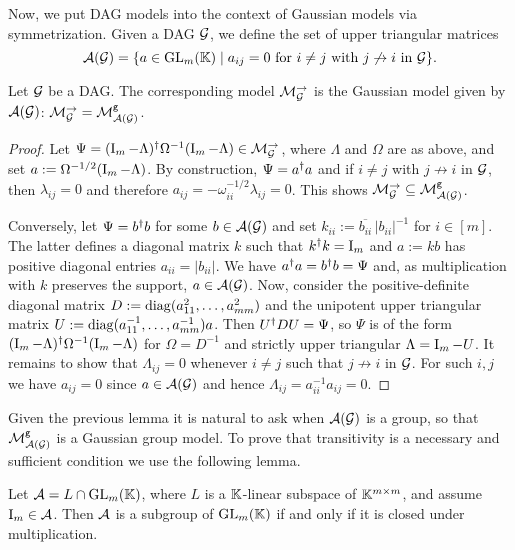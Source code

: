 Now, we put DAG models into the context of Gaussian models via symmetrization. Given a DAG $\mathcal{G}$, we define the set of upper triangular matrices
\begin{equation}
	\label{eq:defnAG} %
	\AG = \{ a \in \GL_m(\KK) \mid a_{ij}=0 \text{ for } i \neq j \text{ with } j \not \to i \text{ in }  \Gcal \} .
\end{equation}


\begin{lemma}
	\label{lem:DAGmodelEqualsMgAG}
	Let $\mathcal{G}$ be a DAG. The corresponding model $\mathcal{M}_{\mathcal{G}}^{\to}$ is the Gaussian model given by $\mathcal{A}(\mathcal{G})$: $\mathcal{M}_{\mathcal{G}}^{\to} = \mathcal{M}^{\mathtt{g}}_{\mathcal{A}(\mathcal{G})}$.
\end{lemma}

\begin{proof}
	Let $\Psi = (\operatorname{I}_m - \Lambda)^{\dagger} \Omega^{-1} (\operatorname{I}_m - \Lambda) \in \mathcal{M}_{\mathcal{G}}^{\to}$, where $\Lambda$ and $\Omega$ are as above, and set
	$a := \Omega^{-1/2} (\operatorname{I}_m - \Lambda)$. By construction, $\Psi = a^{\dagger} a$ and if $i \neq j$ with $j \not \to i$ in $\mathcal{G}$, then $\lambda_{ij} = 0$ and therefore $a_{ij} = -\omega_{ii}^{-1/2} \lambda_{ij} = 0$. This shows  $\mathcal{M}_{\mathcal{G}}^{\to} \subseteq \mathcal{M}^{\mathtt{g}}_{\mathcal{A}(\mathcal{G})}$.
	
	Conversely, let $\Psi = b^{\dagger} b$ for some $b \in \mathcal{A}(\mathcal{G})$ and set $k_{ii} := \overline{b_{ii}} \, |b_{ii}|^{-1}$ for $i \in [m]$. The latter defines a diagonal matrix $k$ such that $k^{\dagger} k = \operatorname{I}_m$ and $a := kb$ has positive diagonal entries $a_{ii} = |b_{ii}|$. We have $a^{\dagger} a = b^{\dagger} b = \Psi$ and, as multiplication with $k$ preserves the support, $a \in \mathcal{A}(\mathcal{G})$. 
	Now, consider the positive-definite diagonal matrix $D := \operatorname{diag}( a_{11}^2, \ldots, a_{mm}^2 )$ and the unipotent upper triangular matrix $U := \operatorname{diag}( a_{11}^{-1}, \ldots, a_{mm}^{-1} ) a$. Then $U^{\dagger} D U = \Psi$, so $\Psi$ is of the form $(\operatorname{I}_m - \Lambda)^{\dagger} \Omega^{-1} (\operatorname{I}_m - \Lambda)$ for $\Omega = D^{-1}$ and strictly upper triangular $\Lambda = \operatorname{I}_m - U$. It remains to show that $\Lambda_{ij} = 0$ whenever $i \neq j$ such that $j \not \to i$ in $\mathcal{G}$. For such $i,j$ we have $a_{ij} = 0$ since $a \in \mathcal{A}(\mathcal{G})$ and hence $\Lambda_{ij} = a_{ii}^{-1} a_{ij} = 0$. 
\end{proof}

Given the previous lemma it is natural to ask when $\mathcal{A}(\mathcal{G})$ is a group, so that $\mathcal{M}^{\mathtt{g}}_{\mathcal{A}(\mathcal{G})}$ is a Gaussian group model.
To prove that transitivity is a necessary and sufficient condition we use the following lemma.

\begin{lemma}\label{lem:GroupOnlyMultiplication}
	Let $\mathcal{A} = L \cap \operatorname{GL}_m(\mathbb K)$, where $L$ is a $\mathbb K$-linear subspace of $\mathbb K^{m \times m}$, and assume $\operatorname{I}_m \in \mathcal{A}$. Then $\mathcal{A}$ is a subgroup of $\operatorname{GL}_m(\mathbb K)$ if and only if it is closed under multiplication.
\end{lemma}

